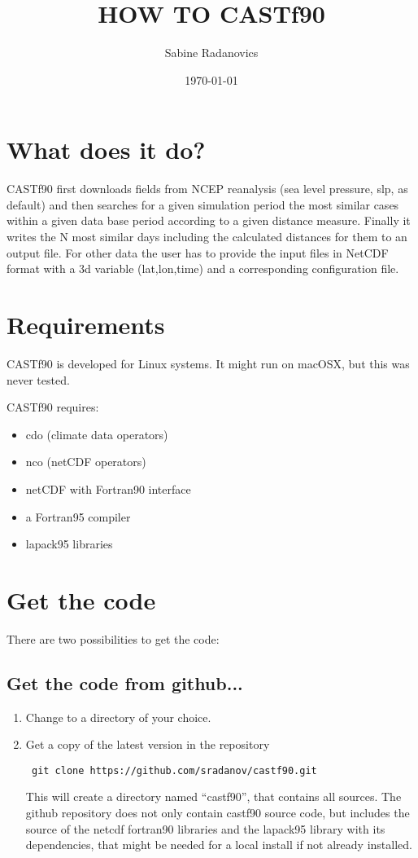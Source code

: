 \documentclass[11p,a4paper]{article}
\title{HOW TO CASTf90}
\author{Sabine Radanovics}
\date{\today}
\begin{document}
\maketitle
\tableofcontents
\section{What does it do?}
CASTf90 first downloads fields from NCEP reanalysis (sea level pressure, slp, as default) and then searches for a given simulation period the most similar cases within a given data base period according to a given distance measure. Finally it writes the N most similar days including the calculated distances for them to an output file. For other data the user has to provide the input files in NetCDF format with a 3d variable (lat,lon,time) and a corresponding configuration file.
\section{Requirements}
CASTf90 is developed for Linux systems. It might run on macOSX, but this was never tested. 

CASTf90 requires:
\begin{itemize}
 \item cdo (climate data operators)
 \item nco (netCDF operators)
 \item netCDF with Fortran90 interface
 \item a Fortran95 compiler
 \item lapack95 libraries
\end{itemize}

\section{Get the code}
There are two possibilities to get the code:
\subsection{Get the code from github...}
\begin{enumerate}
\item Change to a directory of your choice.
\item Get a copy of the latest version in the repository
\begin{verbatim}
 git clone https://github.com/sradanov/castf90.git
\end{verbatim}
This will create a directory named ``castf90'', that contains all sources. The github repository does not only contain castf90 source code, but includes the source of the netcdf fortran90 libraries and the lapack95 library with its dependencies, that might be needed for a local install if not already installed. 
\end{enumerate}
\end{document}
